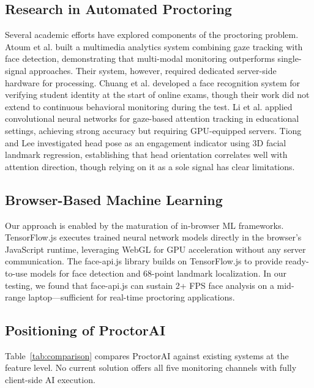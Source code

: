 \documentclass[conference]{IEEEtran}
\begin{document}
\subsection{Research in Automated Proctoring}

Several academic efforts have explored components of the proctoring problem. Atoum et al. \cite{atoum2017} built a multimedia analytics system combining gaze tracking with face detection, demonstrating that multi-modal monitoring outperforms single-signal approaches. Their system, however, required dedicated server-side hardware for processing. Chuang et al. \cite{chuang2017} developed a face recognition system for verifying student identity at the start of online exams, though their work did not extend to continuous behavioral monitoring during the test. Li et al. \cite{li2021} applied convolutional neural networks for gaze-based attention tracking in educational settings, achieving strong accuracy but requiring GPU-equipped servers. Tiong and Lee \cite{tiong2021} investigated head pose as an engagement indicator using 3D facial landmark regression, establishing that head orientation correlates well with attention direction, though relying on it as a sole signal has clear limitations.

\subsection{Browser-Based Machine Learning}

Our approach is enabled by the maturation of in-browser ML frameworks. TensorFlow.js \cite{smilkov2019} executes trained neural network models directly in the browser's JavaScript runtime, leveraging WebGL for GPU acceleration without any server communication. The face-api.js library \cite{faceapijs} builds on TensorFlow.js to provide ready-to-use models for face detection and 68-point landmark localization. In our testing, we found that face-api.js can sustain 2+ FPS face analysis on a mid-range laptop---sufficient for real-time proctoring applications.

\subsection{Positioning of ProctorAI}

Table~\ref{tab:comparison} compares ProctorAI against existing systems at the feature level. No current solution offers all five monitoring channels with fully client-side AI execution.
\end{document}
